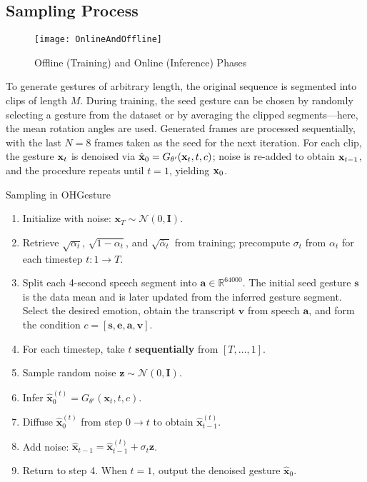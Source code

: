 \subsection{Sampling Process}

\begin{figure}[H]
	\centering
	\texttt{[image: OnlineAndOffline]}
	\caption{Offline (Training) and Online (Inference) Phases}
	\label{fig:OnlineAndOffline}
\end{figure}

To generate gestures of arbitrary length, the original sequence is segmented into clips of length $M$.
During training, the seed gesture can be chosen by randomly selecting a gesture from the dataset or by averaging the clipped segments—here, the mean rotation angles are used.  
Generated frames are processed sequentially, with the last $N=8$ frames taken as the seed for the next iteration.  
For each clip, the gesture $\mathbf{x}_{t}$ is denoised via $\hat{\mathbf{x}}_{0} = G_{\theta'}(\mathbf{x}_{t}, t, c)$; noise is re-added to obtain $\mathbf{x}_{t-1}$, and the procedure repeats until $t=1$, yielding $\mathbf{x}_{0}$.

\begin{algorithm}[H]
	\caption{Sampling in OHGesture}
	\label{alg:sampling}
	\setlength{\baselineskip}{10pt}
	\begin{enumerate}
		\item Initialize with noise: $\mathbf{x}_T \sim \mathcal{N}(0, \mathbf{I})$.
		\item Retrieve $\sqrt{\alpha_t}$, $\sqrt{1 - \alpha_t}$, and $\sqrt{\bar{\alpha}_t}$ from training; precompute $\sigma_t$ from $\alpha_t$ for each timestep $t: 1 \rightarrow T$.
		\item Split each 4-second speech segment into $\mathbf{a} \in \mathbb{R}^{64000}$.  
		      The initial seed gesture $\mathbf{s}$ is the data mean and is later updated from the inferred gesture segment.  
		      Select the desired emotion, obtain the transcript $\mathbf{v}$ from speech $\mathbf{a}$, and form the condition $c = [\mathbf{s}, \mathbf{e}, \mathbf{a}, \mathbf{v}]$.
		\item For each timestep, take $t$ \textbf{sequentially} from $[T, \dots, 1]$.
		\item Sample random noise $\mathbf{z} \sim \mathcal{N}(0, \mathbf{I})$.
		\item Infer $\hat{\mathbf{x}}_0^{(t)} = G_{\theta'}(\mathbf{x}_t, t, c)$.
		\item Diffuse $\hat{\mathbf{x}}_0^{(t)}$ from step $0 \rightarrow t$ to obtain $\hat{\mathbf{x}}_{t-1}^{(t)}$.
		\item Add noise: $\hat{\mathbf{x}}_{t-1} = \hat{\mathbf{x}}_{t-1}^{(t)} + \sigma_t \mathbf{z}$.
		\item Return to step 4.  
		      When $t = 1$, output the denoised gesture $\hat{\mathbf{x}}_0$.
	\end{enumerate}
\end{algorithm}

